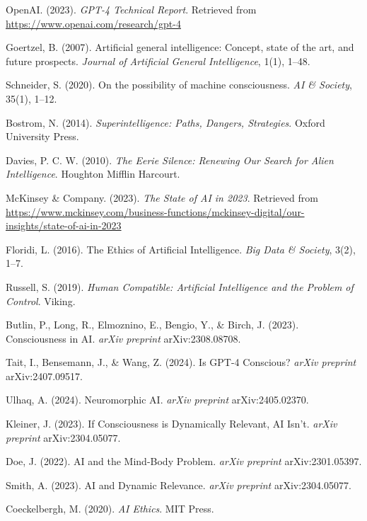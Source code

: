 \documentclass[12pt]{article}
\begin{document}
\begin{thebibliography}{999}
OpenAI. (2023).
\textit{GPT-4 Technical Report}.
Retrieved from \url{https://www.openai.com/research/gpt-4}

Goertzel, B. (2007).
Artificial general intelligence: Concept, state of the art, and future prospects.
\textit{Journal of Artificial General Intelligence}, 1(1), 1--48.

Schneider, S. (2020).
On the possibility of machine consciousness.
\textit{AI \& Society}, 35(1), 1--12.

Bostrom, N. (2014).
\textit{Superintelligence: Paths, Dangers, Strategies}.
Oxford University Press.

Davies, P. C. W. (2010).
\textit{The Eerie Silence: Renewing Our Search for Alien Intelligence}.
Houghton Mifflin Harcourt.

McKinsey \& Company. (2023).
\textit{The State of AI in 2023}.
Retrieved from \url{https://www.mckinsey.com/business-functions/mckinsey-digital/our-insights/state-of-ai-in-2023}

Floridi, L. (2016).
The Ethics of Artificial Intelligence.
\textit{Big Data \& Society}, 3(2), 1--7.

Russell, S. (2019).
\textit{Human Compatible: Artificial Intelligence and the Problem of Control}.
Viking.

Butlin, P., Long, R., Elmoznino, E., Bengio, Y., \& Birch, J. (2023).
Consciousness in AI.
\textit{arXiv preprint} arXiv:2308.08708.

Tait, I., Bensemann, J., \& Wang, Z. (2024).
Is GPT-4 Conscious?
\textit{arXiv preprint} arXiv:2407.09517.

Ulhaq, A. (2024).
Neuromorphic AI.
\textit{arXiv preprint} arXiv:2405.02370.

Kleiner, J. (2023).
If Consciousness is Dynamically Relevant, AI Isn't.
\textit{arXiv preprint} arXiv:2304.05077.

Doe, J. (2022).
AI and the Mind-Body Problem.
\textit{arXiv preprint} arXiv:2301.05397.

Smith, A. (2023).
AI and Dynamic Relevance.
\textit{arXiv preprint} arXiv:2304.05077.

Coeckelbergh, M. (2020).
\textit{AI Ethics}.
MIT Press.


\end{thebibliography}
\end{document}
